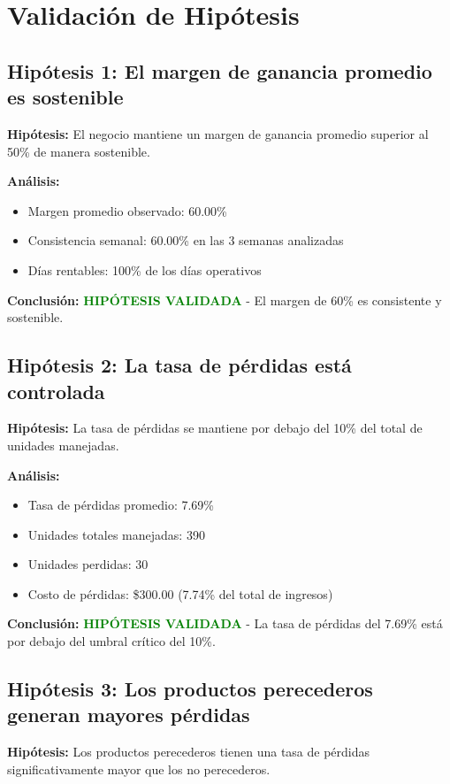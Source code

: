 \documentclass[12pt,a4paper]{article}
\begin{document}
\section{Validación de Hipótesis}

\subsection{Hipótesis 1: El margen de ganancia promedio es sostenible}
\textbf{Hipótesis:} El negocio mantiene un margen de ganancia promedio superior al 50\% de manera sostenible.

\textbf{Análisis:}
\begin{itemize}
    \item Margen promedio observado: 60.00\%
    \item Consistencia semanal: 60.00\% en las 3 semanas analizadas
    \item Días rentables: 100\% de los días operativos
\end{itemize}

\textbf{Conclusión:} \textcolor{green}{\textbf{HIPÓTESIS VALIDADA}} - El margen de 60\% es consistente y sostenible.

\subsection{Hipótesis 2: La tasa de pérdidas está controlada}
\textbf{Hipótesis:} La tasa de pérdidas se mantiene por debajo del 10\% del total de unidades manejadas.

\textbf{Análisis:}
\begin{itemize}
    \item Tasa de pérdidas promedio: 7.69\%
    \item Unidades totales manejadas: 390
    \item Unidades perdidas: 30
    \item Costo de pérdidas: \$300.00 (7.74\% del total de ingresos)
\end{itemize}

\textbf{Conclusión:} \textcolor{green}{\textbf{HIPÓTESIS VALIDADA}} - La tasa de pérdidas del 7.69\% está por debajo del umbral crítico del 10\%.

\subsection{Hipótesis 3: Los productos perecederos generan mayores pérdidas}
\textbf{Hipótesis:} Los productos perecederos tienen una tasa de pérdidas significativamente mayor que los no perecederos.
\end{document}
